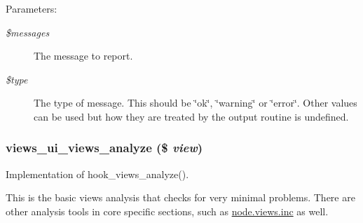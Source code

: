 \begin{Desc}
\item[Parameters:]
\begin{description}
\item[{\em \$messages}]The message to report. \item[{\em \$type}]The type of message. This should be \char`\"{}ok\char`\"{}, \char`\"{}warning\char`\"{} or \char`\"{}error\char`\"{}. Other values can be used but how they are treated by the output routine is undefined. \end{description}
\end{Desc}
\hypertarget{analyze_8inc_bda4985a58e7461d134687a85c92f65f}{
\subsubsection[{views\_\-ui\_\-views\_\-analyze}]{\setlength{\rightskip}{0pt plus 5cm}views\_\-ui\_\-views\_\-analyze (\$ {\em view})}}
\label{analyze_8inc_bda4985a58e7461d134687a85c92f65f}


Implementation of hook\_\-views\_\-analyze().

This is the basic views analysis that checks for very minimal problems. There are other analysis tools in core specific sections, such as \hyperlink{node_8views_8inc}{node.views.inc} as well. 